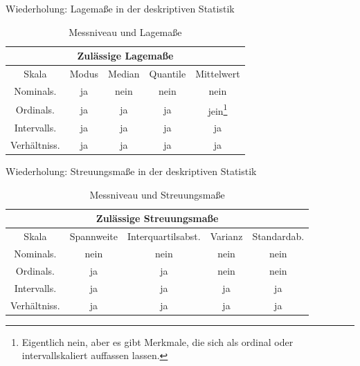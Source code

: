 \documentclass[usenames,dvipsnames,handout]{beamer}
\begin{document}
\begin{frame}{Wiederholung: Lagemaße in der deskriptiven Statistik}
 \begin{table}[ht]
\centering
\begin{center}
\caption{Messniveau und Lagemaße}
\begin{tabular}{c|c|c|c|c}
	\hline
	\multicolumn{5}{c}{Zulässige Lagemaße}\\ \hline
	Skala& Modus & Median & Quantile & Mittelwert\\\hline
	Nominals.    & \colorbox{green!30}{ja} & \colorbox{red!30}{nein} & \colorbox{red!30}{nein} & \colorbox{red!30}{nein} \\
	Ordinals.    & \colorbox{green!30}{ja} & \colorbox{green!30}{ja} & \colorbox{green!30}{ja} & \colorbox{orange!30}{jein\footnote{Eigentlich nein, aber es gibt Merkmale, die sich als ordinal oder intervallskaliert auffassen lassen.}} \\ \hline
	Intervalls.  & \colorbox{green!30}{ja} & \colorbox{green!30}{ja} & \colorbox{green!30}{ja} & \colorbox{green!30}{ja}\\
	Verhältniss. & \colorbox{green!30}{ja} & \colorbox{green!30}{ja} & \colorbox{green!30}{ja} & \colorbox{green!30}{ja} \\
	\hline
\end{tabular}
\end{center}
\label{tab:multicol0}
\end{table}
\end{frame}

\begin{frame}{Wiederholung: Streuungsmaße in der deskriptiven Statistik}
 \begin{table}[ht]
\centering
\begin{center}
\caption{Messniveau und Streuungsmaße}
\begin{tabular}{c|c|c|c|c}
	\hline
	\multicolumn{5}{c}{Zulässige Streuungsmaße}\\ \hline
	Skala& Spannweite & Interquartilsabst.& Varianz & Standardab.\\\hline
	Nominals.    & \colorbox{red!30}{nein} & \colorbox{red!30}{nein} & \colorbox{red!30}{nein} & \colorbox{red!30}{nein} \\
	Ordinals.    & \colorbox{green!30}{ja} & \colorbox{green!30}{ja} & \colorbox{red!30}{nein} & \colorbox{red!30}{nein} \\ \hline
	Intervalls.  & \colorbox{green!30}{ja} & \colorbox{green!30}{ja} & \colorbox{green!30}{ja} & \colorbox{green!30}{ja}\\
	Verhältniss. & \colorbox{green!30}{ja} & \colorbox{green!30}{ja} & \colorbox{green!30}{ja} & \colorbox{green!30}{ja} \\
	\hline
\end{tabular}
\end{center}
\label{tab:multicol0}
\end{table}
\end{frame}
\end{document}
